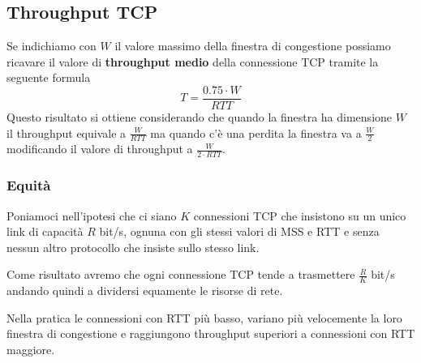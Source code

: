 \subsection{Throughput TCP}
Se indichiamo con $W$ il valore massimo della finestra di congestione
possiamo ricavare il valore di \textbf{throughput medio} della 
connessione TCP tramite la seguente formula
\[ T = \frac{0.75 \cdot W}{RTT} \]
Questo risultato si ottiene considerando che quando la finestra ha 
dimensione $W$ il throughput equivale a $\frac{W}{RTT}$ ma quando c'è 
una perdita la finestra va a $\frac{W}{2}$ modificando il valore di 
throughput a $\frac{W}{2 \cdot RTT}$.

\subsubsection{Equità}
Poniamoci nell'ipotesi che ci siano $K$ connessioni TCP che insistono 
su un unico link di capacità $R$ bit/s, ognuna con gli stessi valori di
MSS e RTT e senza nessun altro protocollo che insiste sullo stesso 
link.

Come risultato avremo che ogni connessione TCP tende a trasmettere 
$\frac{R}{K}$ bit/s andando quindi a dividersi equamente le risorse 
di rete.

Nella pratica le connessioni con RTT più basso, variano più velocemente
la loro finestra di congestione e raggiungono throughput superiori a 
connessioni con RTT maggiore.
